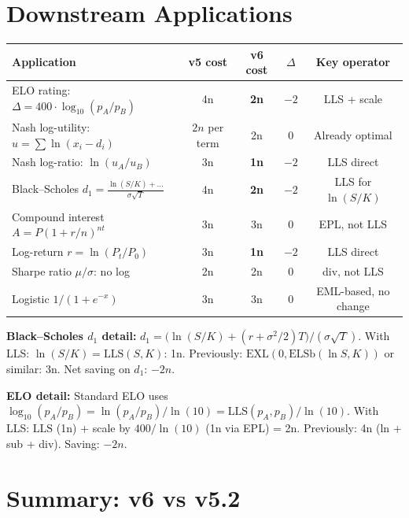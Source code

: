 \documentclass[11pt]{article}
\newcommand{\imp}[1]{\textcolor{improved}{\textbf{#1}}}
\newcommand{\sam}[1]{\textcolor{same}{#1}}
\begin{document}
\section{Downstream Applications}
\label{sec:downstream}

\begin{center}
\begin{tabular}{lcccc}
\toprule
Application & v5 cost & v6 cost & $\Delta$ & Key operator \\
\midrule
ELO rating: $\Delta = 400 \cdot \log_{10}(p_A/p_B)$ & 4n & \imp{2n} & $-2$ & LLS + scale \\
Nash log-utility: $u = \sum \ln(x_i - d_i)$ & $2n$ per term & \sam{2n} & 0 & Already optimal \\
Nash log-ratio: $\ln(u_A/u_B)$ & 3n & \imp{1n} & $-2$ & LLS direct \\
Black--Scholes $d_1 = \frac{\ln(S/K)+\ldots}{\sigma\sqrt{T}}$ & 4n & \imp{2n} & $-2$ & LLS for $\ln(S/K)$ \\
Compound interest $A = P(1+r/n)^{nt}$ & 3n & \sam{3n} & 0 & EPL, not LLS \\
Log-return $r = \ln(P_t/P_0)$ & 3n & \imp{1n} & $-2$ & LLS direct \\
Sharpe ratio $\mu/\sigma$: no log & 2n & \sam{2n} & 0 & div, not LLS \\
Logistic $1/(1+e^{-x})$ & 3n & \sam{3n} & 0 & EML-based, no change \\
\bottomrule
\end{tabular}
\end{center}

\noindent \textbf{Black--Scholes $d_1$ detail:}
$d_1 = \bigl(\ln(S/K) + (r + \sigma^2/2)T\bigr) / (\sigma\sqrt{T})$.
With LLS: $\ln(S/K) = \mathrm{LLS}(S,K)$: 1n.
Previously: $\mathrm{EXL}(0, \mathrm{ELSb}(\ln S, K))$ or similar: 3n.
Net saving on $d_1$: $-2n$.

\noindent \textbf{ELO detail:}
Standard ELO uses $\log_{10}(p_A/p_B) = \ln(p_A/p_B)/\ln(10) = \mathrm{LLS}(p_A,p_B)/\ln(10)$.
With LLS: $\mathrm{LLS}$ (1n) + scale by $400/\ln(10)$ (1n via EPL) = 2n.
Previously: 4n (ln + sub + div). Saving: $-2n$.

\section{Summary: v6 vs v5.2}
\label{sec:summary}
\end{document}
